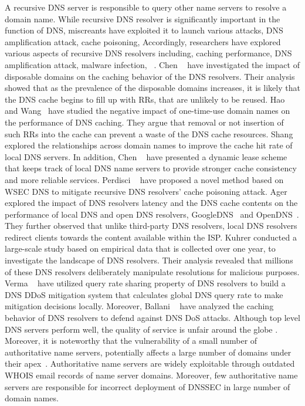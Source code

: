 A recursive DNS server is responsible to query other name servers to resolve a domain name. While recursive DNS resolver is significantly important in the function of DNS, miscreants have exploited it to launch various attacks, \eg DNS amplification attack, cache poisoning, \etc Accordingly, researchers have explored various aspects of recursive DNS resolvers including, caching performance, DNS amplification attack, malware infection, \etc~.  Chen \etal~ have investigated the impact of disposable domains on the caching behavior of the DNS resolvers. Their analysis showed that as the prevalence of the disposable domains increases, it is likely that the DNS cache begins to fill up with RRs, that are unlikely to be reused. Hao and Wang~ have studied the negative impact of one-time-use domain names on the performance of DNS caching. They argue that removal or not insertion of such RRs into the cache can prevent a waste of the DNS cache resources. 
Shang \etal~ explored the relationships across domain names to improve the cache hit rate of local DNS servers. In addition, Chen \etal~ have presented a dynamic lease scheme that keeps track of local DNS name servers to provide stronger cache consistency and more reliable services. Perdisci \etal~ have proposed a novel method based on WSEC DNS to mitigate recursive DNS resolvers’ cache poisoning attack. 
Ager \etal ~ explored the impact of DNS resolvers latency and the DNS cache contents on the performance of local DNS and open DNS resolvers, \eg GoogleDNS~ and OpenDNS~. They further observed that unlike third-party DNS resolvers, local DNS resolvers redirect clients towards the content available within the ISP. Kuhrer \etal  conducted a large-scale study based on empirical data that is collected over one year, to investigate the landscape of DNS resolvers. Their analysis revealed that millions of these DNS resolvers deliberately manipulate resolutions for malicious purposes. 
Verma \etal~ have utilized query rate sharing property of DNS resolvers to build a DNS DDoS mitigation system that calculates global DNS query rate to make mitigation decisions locally. Moreover, Ballani \etal~ have analyzed the caching behavior of DNS resolvers to defend against DNS DoS attacks. 
 Although top level DNS servers perform well, the quality of service is unfair around the globe . Moreover, it is noteworthy that the vulnerability of a small number of authoritative name servers, potentially affects a large number of domains under their apex~. Authoritative name servers are widely exploitable through outdated WHOIS email records of name server domains. Moreover, few authoritative name servers are responsible for incorrect deployment of DNSSEC in large number of domain names.

